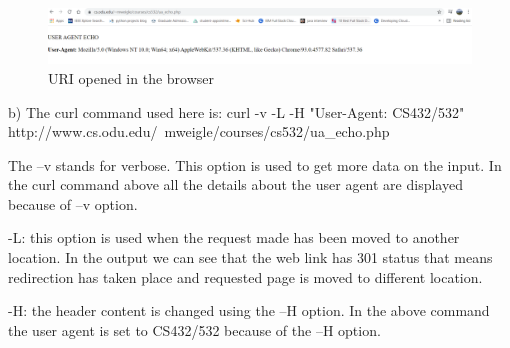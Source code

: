 \documentclass[12pt]{article}
\begin{document}
\begin{figure}[h]
    \centering
    \includegraphics[trim=0 0 10 8, clip, width=\textwidth] {two.PNG}
    \caption{URI opened in the browser}
    \label{fig:web-growth}
\end{figure}
\newline
\newline
b) The curl command used here is:
\newline\newline
curl -v -L -H "User-Agent: CS432/532"  http://www.cs.odu.edu/~mweigle/courses/cs532/ua_echo.php
\newline

The –v stands for verbose. This option is used to get more data on the input. In the curl command above all the details about the user agent are displayed because of –v option.

-L: this option is used when the request made has been moved to another location. In the output we can see that the web link has 301 status that means redirection has taken place and requested page is moved to different location.

-H: the header content is changed using the –H option. In the above command the user agent is set to CS432/532 because of the –H option.
\end{document}
